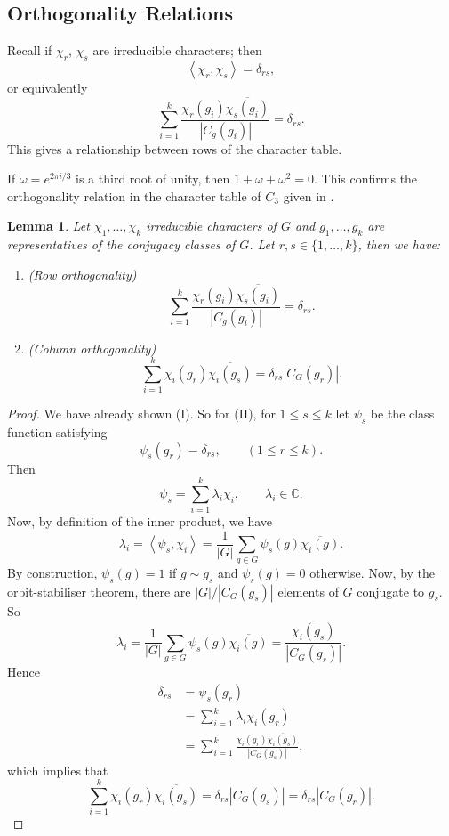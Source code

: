 \documentclass[11pt, notitlepage]{article}
\numberwithin{equation}{section}
\theoremstyle{plain}
\newtheorem{lemma}[theorem]{Lemma}
\theoremstyle{definition}
\newenvironment{example}
	{\pushQED{\qed}\renewcommand{\qedsymbol}{$\blacktriangleleft$}\examplex}
	{\popQED\endexamplex}
\newcommand{\C}{\mathbb{C}}
\newcommand{\inner}[2]{\left\langle #1,#2 \right\rangle}
\begin{document}
\subsection{Orthogonality Relations}


Recall if $\chi_r$, $\chi_s$ are irreducible characters; then
\[
    \inner{\chi_r}{\chi_s} = \delta_{rs},
\]
or equivalently
\[
    \sum_{i=1}^k \frac{\chi_r(g_i)\overline{\chi_s(g_i)}}{|C_g(g_i)|} = \delta_{rs}.
\]
This gives a relationship between rows of the character table.

\begin{example}
If $\omega = e^{2\pi i/3}$ is a third root of unity, then $1 + \omega + \omega^2 = 0$. This confirms the orthogonality relation in the character table of $C_3$ given in .
\end{example}

\begin{lemma}
Let $\chi_1,\dots,\chi_k$ irreducible characters of $G$ and $g_1,\dots,g_k$ are representatives of the conjugacy classes of $G$. Let $r,s \in \{1,\dots,k\}$, then we have:
\begin{enumerate}[label=\emph{(\Roman*)}]
    \item \emph{(Row orthogonality)}
    \[
        \sum_{i=1}^k \frac{\chi_r(g_i)\overline{\chi_s(g_i)}}{|C_g(g_i)|} = \delta_{rs}.
    \]
    \item \emph{(Column orthogonality)}
    \[
        \sum_{i=1}^k \chi_i(g_r)\overline{\chi_i(g_s)} = \delta_{rs}|C_G(g_r)|.
    \]
\end{enumerate}
\end{lemma}

\begin{proof}
We have already shown (I). So for (II), for $1 \le s \le k$ let $\psi_s$ be the class function satisfying
\[
    \psi_s(g_r) = \delta_{rs}, \qquad (1 \le r \le k).
\]
Then
\[
    \psi_s = \sum_{i=1}^k \lambda_i \chi_i, \qquad \lambda_i \in \C.
\]
Now, by definition of the inner product, we have
\[
    \lambda_i = \inner{\psi_s}{\chi_i} = \frac{1}{|G|} \sum_{g \in G}\psi_s(g) \overline{\chi_i(g)}.
\]
By construction, $\psi_s(g) = 1$ if $g \sim g_s$ and $\psi_s(g) = 0$ otherwise. Now, by the orbit-stabiliser theorem, there are $|G|/|C_G(g_s)|$ elements of $G$ conjugate to $g_s$. So
\[
    \lambda_i = \frac{1}{|G|} \sum_{g \in G}\psi_s(g) \overline{\chi_i(g)} = \frac{\overline{\chi_i(g_s)}}{|C_G(g_s)|}.
\]
Hence
\begin{align*}
    \delta_{rs} &= \psi_s(g_r)\\
    &= \sum_{i=1}^k\lambda_i\chi_i(g_r)\\
    &= \sum_{i=1}^k \frac{\chi_i(g_r)\overline{\chi_i(g_s)}}{|C_G(g_s)|},
\end{align*}
which implies that
\[
    \sum_{i=1}^k \chi_i(g_r)\overline{\chi_i(g_s)} = \delta_{rs}|C_G(g_s)| = \delta_{rs}|C_G(g_r)|.
\]
\end{proof}
\end{document}
